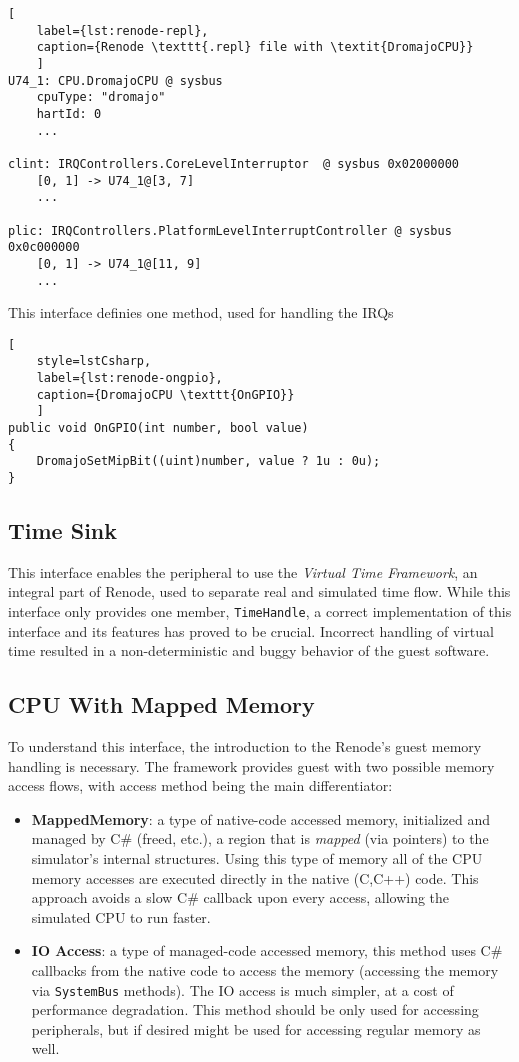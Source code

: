 \begin{lstlisting}[
    label={lst:renode-repl},
    caption={Renode \texttt{.repl} file with \textit{DromajoCPU}}
    ]
U74_1: CPU.DromajoCPU @ sysbus
    cpuType: "dromajo"
    hartId: 0
    ...

clint: IRQControllers.CoreLevelInterruptor  @ sysbus 0x02000000
    [0, 1] -> U74_1@[3, 7]
    ...

plic: IRQControllers.PlatformLevelInterruptController @ sysbus 0x0c000000
    [0, 1] -> U74_1@[11, 9]
    ...
\end{lstlisting}

\noindent
This interface definies one method, used for handling the IRQs

\begin{lstlisting}[
    style=lstCsharp,
    label={lst:renode-ongpio},
    caption={DromajoCPU \texttt{OnGPIO}}
    ]
public void OnGPIO(int number, bool value)
{
    DromajoSetMipBit((uint)number, value ? 1u : 0u);
}
\end{lstlisting}

\pagebreak

\subsection*{Time Sink}
This interface enables the peripheral to use the \textit{Virtual Time Framework}, an integral part of Renode, used to
separate real and simulated time flow. While this interface only provides one member, \texttt{TimeHandle}, a correct
implementation of this interface and its features has proved to be crucial. Incorrect handling of virtual time resulted
in a non-deterministic and buggy behavior of the guest software.

\subsection*{CPU With Mapped Memory}
To understand this interface, the introduction to the Renode's guest memory handling is necessary. The framework
provides guest with two possible memory access flows, with access method being the main differentiator:

\begin{itemize}
    \item{\textbf{MappedMemory}: a type of native-code accessed memory, initialized and managed by C\# (freed, etc.),
    a region that is \textit{mapped} (via pointers) to the simulator's internal structures.} Using this type of memory
    all of the CPU memory accesses are executed directly in the native (C,C++) code. This approach avoids a slow C\#
    callback upon every access, allowing the simulated CPU to run faster.
    \item{\textbf{IO Access}: a type of managed-code accessed memory, this method uses C\# callbacks from the native
    code to access the memory (accessing the memory via \texttt{SystemBus} methods). The IO access is much simpler,
    at a cost of performance degradation. This method should be only used for accessing peripherals, but
    if desired might be used for accessing regular memory as well.}
\end{itemize}


